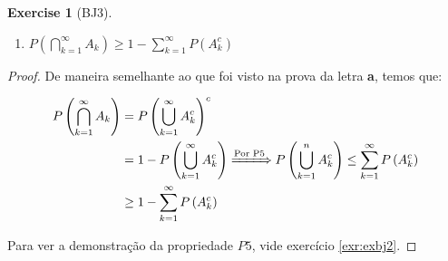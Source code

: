 \documentclass[
]{article}
\providecommand{\tightlist}{%
  \setlength{\itemsep}{0pt}\setlength{\parskip}{0pt}}
\theoremstyle{definition}
\theoremstyle{definition}
\theoremstyle{definition}
\newtheorem{exercise}{Exercise}[section]
\theoremstyle{definition}
\theoremstyle{remark}
\begin{document}
\begin{exercise}[BJ3]
\begin{enumerate}
\def\labelenumi{\alph{enumi})}
\setcounter{enumi}{2}
\tightlist
\item
  \(P\left(\bigcap_{k=1}^{\infty}A_{k}\right) \ge 1 - \sum_{k=1}^{\infty}P(A_{k}^{c})\)
\end{enumerate}

\begin{proof}
De maneira semelhante ao que foi visto na prova da letra \textbf{a}, temos que:

\begin{align*}
P\left(\bigcap_{k=1}^{\infty}A_{k}\right) &= P\left(\bigcup_{k=1}^{\infty}A_{k}^{c}\right)^{c} \\
&= 1 - P\left(\bigcup_{k=1}^{\infty}A_{k}^{c}\right) \xRightarrow[]{\text{Por P5}} P\left(\bigcup_{k=1}^{n}A_{k}^{c}\right) \le \sum_{k=1}^{\infty}P\left(A_{k}^{c}\right) \\
&\ge 1 - \sum_{k=1}^{\infty}P\left(A_{k}^{c}\right)
\end{align*}

Para ver a demonstração da propriedade \(P5\), vide exercício \ref{exr:exbj2}.
\end{proof}

\end{exercise}
\end{document}
